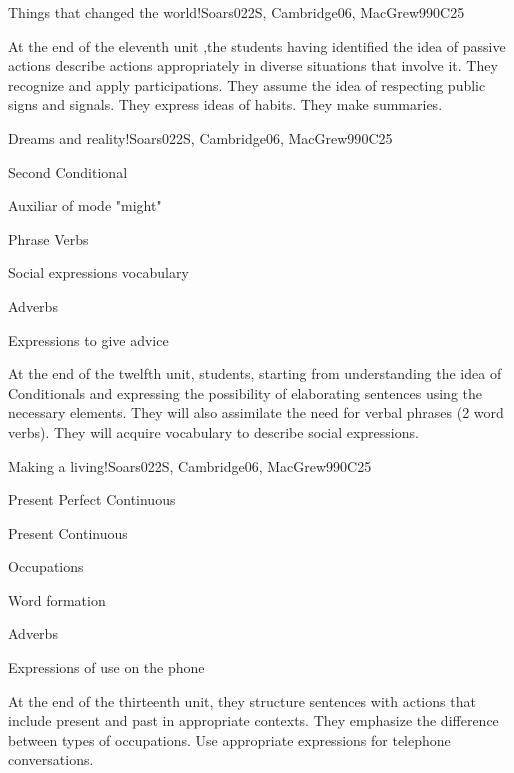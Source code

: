 \begin{syllabus}
\begin{unit}{Things that changed the world!}{}{Soars022S, Cambridge06, MacGrew99}{0}{C25}
   \begin{learningoutcomes}
      \item At the end of the eleventh unit ,the students having identified the idea of passive actions describe actions appropriately in diverse situations that involve it. They recognize and apply participations. They assume the idea of respecting public signs and signals. They express ideas of habits. They make summaries.
   \end{learningoutcomes}
\end{unit}

\begin{unit}{Dreams and reality!}{}{Soars022S, Cambridge06, MacGrew99}{0}{C25}
   \begin{topics}
       \item Second Conditional
       \item Auxiliar of mode "might"
       \item Phrase Verbs
       \item Social expressions vocabulary
       \item Adverbs
       \item Expressions to give advice
   \end{topics}

   \begin{learningoutcomes}
      \item At the end of the twelfth unit, students, starting from understanding the idea of Conditionals and expressing the possibility of elaborating sentences using the necessary elements. They will also assimilate the need for verbal phrases (2 word verbs). They will acquire vocabulary to describe social expressions.
   \end{learningoutcomes}
\end{unit}

\begin{unit}{Making a living!}{}{Soars022S, Cambridge06, MacGrew99}{0}{C25}
   \begin{topics}
       \item Present Perfect Continuous
       \item Present Continuous
       \item Occupations
       \item Word formation
       \item Adverbs
       \item Expressions of use on the phone
   \end{topics}

   \begin{learningoutcomes}
      \item At the end of the thirteenth unit, they structure sentences with actions that include present and past in appropriate contexts. They emphasize the difference between types of occupations. Use appropriate expressions for telephone conversations.
   \end{learningoutcomes}
\end{unit}


\end{syllabus}

